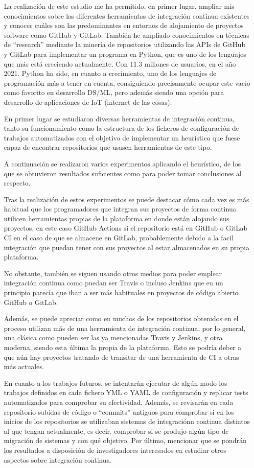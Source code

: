 La realización de este estudio me ha permitido, en primer lugar, ampliar mis conocimientos sobre las diferentes herramientas de integración continua existentes y conocer cuáles son las predominantes en entornos de alojamiento de proyectos software como GitHub y GitLab.
También he ampliado conocimientos en técnicas de ``research'' mediante la minería de repositorios utilizando las APIs de GitHub y GitLab para implementar un programa en Python, que es uno de los lenguajes que más está creciendo actualmente. 
Con 11.3 millones de usuarios, en el año 2021, Python ha sido, en cuanto a crecimiento, uno de los lenguajes de programación más a tener en cuenta, consiguiendo precisamente ocupar este vacío como favorito en desarrollo DS/ML, pero además siendo una opción para desarrollo de aplicaciones de IoT (internet de las cosas).

En primer lugar se estudiaron diversas herramientas de integración continua, tanto su funcionamiento como la estructura de los ficheros de configuración de trabajos automatizados con el objetivo de implementar un heurístico que fuese capaz de encontrar repositorios que usasen herramientas de este tipo.

A continuación se realizaron varios experimentos aplicando el heurístico, de los que se obtuvieron resultados suficientes como para poder tomar conclusiones al respecto.

Tras la realización de estos experimentos se puede destacar cómo cada vez es más habitual que los programadores que integran sus proyectos de forma continua utilicen herramientas propias de la plataforma en donde están alojando sus proyectos, en este caso GitHub Actions si el repositorio está en GitHub o GitLab CI en el caso de que se almacene en GitLab, probablemente debido a la facil integración que puedan tener con sus proyectos al estar almacenados en su propia plataforma.

No obstante, también se siguen usando otros medios para poder emplear integración continua como puedan ser Travis o incluso Jenkins que en un principio parecía que iban a ser más habituales en proyectos de código abierto GitHub o GitLab. 

Además, se puede apreciar como en muchos de los repositorios obtenidos en el proceso utilizan más de una herramienta de integración continua, por lo general, una clásica como pueden ser las ya mencionadas Travis y Jenkins, y otra moderna, siendo esta última la propia de la plataforma. Esto se podría deber a que aún hay proyectos tratando de transitar de una herramienta de CI a otras más actuales.

En cuanto a los trabajos futuros, se intentarán ejecutar de algún modo los trabajos definidos en cada fichero YML o YAML de configuración y replicar tests automatizados para comprobar su efectividad. Además, se revisarán en cada repositorio subidas de código o ``commits'' antiguos para comprobar si en los inicios de los repositorios se utilizaban sistemas de integraciónn continua distintos al que tengan actualmente, es decir, comprobar si se produjo algún tipo de migración de sistemas y con qué objetivo. Por último, mencionar que se pondrán los resultados a disposición de investigadores interesados en estudiar otros aspectos sobre integración continua.
